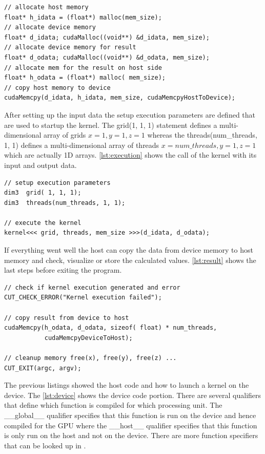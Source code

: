 \begin{lstlisting}[caption=Data transfer of data, label=lst:datatransfer]
// allocate host memory 
float* h_idata = (float*) malloc(mem_size);
// allocate device memory 
float* d_idata; cudaMalloc((void**) &d_idata, mem_size);
// allocate device memory for result
float* d_odata; cudaMalloc((void**) &d_odata, mem_size);
// allocate mem for the result on host side
float* h_odata = (float*) malloc( mem_size);
// copy host memory to device 
cudaMemcpy(d_idata, h_idata, mem_size, cudaMemcpyHostToDevice);
\end{lstlisting} 


After setting up the input data the setup execution parameters are defined that
are used to startup the kernel. The \textsf{grid(1, 1, 1)} statement defines
a multi-dimensional array of grids $x=1, y=1, z=1$ whereas the
\textsf{threads(num\_threads, 1, 1)} defines a multi-dimensional array of
threads $x=num\_threads, y=1, z=1$ which are actually \gls{1D} arrays.
\autoref{lst:execution} shows the call of the kernel with its input and
output data.


\begin{lstlisting}[caption=Execution of the Kernel, label=lst:execution]
// setup execution parameters
dim3  grid( 1, 1, 1);
dim3  threads(num_threads, 1, 1);

// execute the kernel
kernel<<< grid, threads, mem_size >>>(d_idata, d_odata);
\end{lstlisting} 

If everything went well the host can copy the data from device memory
to host memory and check, visualize or store the calculated values.
\autoref{lst:result} shows the last steps before exiting the program.

\begin{lstlisting}[caption=Retrieving of the Results, label=lst:result]
// check if kernel execution generated and error
CUT_CHECK_ERROR("Kernel execution failed");
 
// copy result from device to host
cudaMemcpy(h_odata, d_odata, sizeof( float) * num_threads, 
           cudaMemcpyDeviceToHost);

// cleanup memory free(x), free(y), free(z) ...
CUT_EXIT(argc, argv);
\end{lstlisting} 

The previous listings showed the host code and how to launch a kernel on the
device. The \autoref{lst:device} shows the device code portion. There are
several qualifiers that define which function is compiled for which processing
unit. The \textsf{\_\_global\_\_} qualifier specifies that this function is run
on the device and hence compiled for the \gls{GPU} where the
\textsf{\_\_host\_\_} qualifier specifies that this function is only run on the
host and not on the device. There are more function specifiers that can be
looked up in \citep{citeulike:3325943}.

